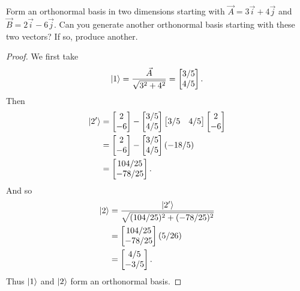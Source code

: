 \begin{exercise}
Form an orthonormal basis in two dimensions starting with $\vec{A} = 3\vec{i} + 4\vec{j}$ and $\vec{B} = 2\vec{i} - 6\vec{j}$. Can you generate another orthonormal basis starting with these two vectors? If so, produce another.
\end{exercise}

\begin{proof}
We first take
\begin{equation*}
   \ket{1} = \frac{\vec{A}}{\sqrt{3^2 + 4^2}} = 
   \begin{bmatrix}
   3/5 \\
   4/5
   \end{bmatrix}.
\end{equation*}
Then
\begin{align*}
   \ket{2'} &=
   \begin{bmatrix}
   2 \\
   -6
   \end{bmatrix}
   - 
   \begin{bmatrix}
   3/5 \\
   4/5
   \end{bmatrix}
   \begin{bmatrix}
   3/5 & 4/5
   \end{bmatrix}
   \begin{bmatrix}
   2 \\
   -6
   \end{bmatrix} \\
   &= 
   \begin{bmatrix}
   2 \\
   -6
   \end{bmatrix}
   - 
   \begin{bmatrix}
   3/5 \\
   4/5
   \end{bmatrix}
   (-18/5) \\
   &= 
   \begin{bmatrix}
   104/25 \\
   -78/25
   \end{bmatrix}.
\end{align*}
And so
\begin{align*}
    \ket{2} &= \frac{\ket{2'}}{\sqrt{(104/25)^2 + (-78/25)^2}} \\
    &= 
    \begin{bmatrix}
   104/25 \\
   -78/25
   \end{bmatrix}
   (5/26) \\
   &= 
   \begin{bmatrix}
   4/5 \\
   -3/5
   \end{bmatrix}.
\end{align*}
Thus $\ket{1}$ and $\ket{2}$ form an orthonormal basis.


\end{proof}
